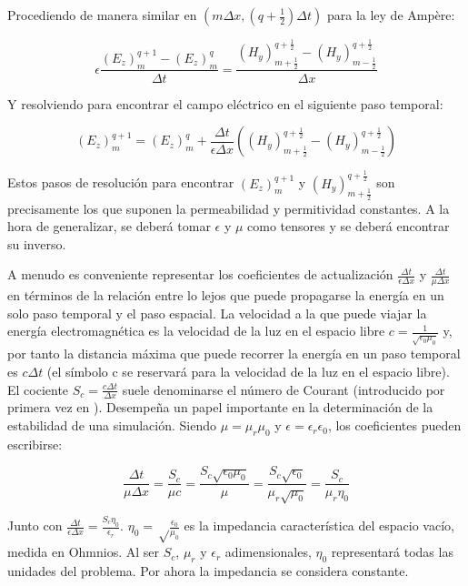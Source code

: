 Procediendo de manera similar en $(m\Delta x, (q+ \frac{1}{2})\Delta t)$ para la ley de Ampère:

\begin{equation}
    \epsilon \frac{(E_z)^{q+1}_{m} - (E_z)^{q}_{m}}{\Delta t} = \frac{(H_y)^{q + \frac{1}{2}}_{m+\frac{1}{2}} - (H_y)^{q+ \frac{1}{2}}_{m-\frac{1}{2}}}{\Delta x}
\end{equation}

Y resolviendo para encontrar el campo eléctrico en el siguiente paso temporal:

\begin{equation}\label{ec:update_E_1D}
    (E_z)^{q+1}_{m} = (E_z)^{q}_{m} + \frac{\Delta t}{\epsilon \Delta x}\left((H_y)^{q + \frac{1}{2}}_{m+\frac{1}{2}} - (H_y)^{q+ \frac{1}{2}}_{m-\frac{1}{2}}\right)
\end{equation}

Estos pasos de resolución para encontrar $(E_z)^{q+1}_{m}$ y $(H_y)^{q+\frac{1}{2}}_{m+\frac{1}{2}}$ son precisamente los que suponen la permeabilidad y permitividad constantes. A la hora de generalizar, se deberá tomar $\epsilon$ y $\mu$ como tensores y se deberá encontrar su inverso.

A menudo es conveniente representar los coeficientes de actualización $\frac{\Delta t}{\epsilon \Delta x}$ y $\frac{\Delta t}{\mu \Delta x}$ en términos de la relación entre lo lejos que puede propagarse la energía en un solo paso temporal y el paso espacial. La velocidad a la que puede viajar la energía electromagnética es la velocidad de la luz en el espacio libre $c = \frac{1}{\sqrt{\epsilon_0 \mu_0}}$ y, por tanto la distancia máxima que puede recorrer la energía en un paso temporal es $c\Delta t$ (el símbolo c se reservará para la velocidad de la luz en el espacio libre). El cociente $S_c = \frac{c\Delta t}{\Delta x}$ suele denominarse el número de Courant (introducido por primera vez en \cite{courant_partial_1956}). Desempeña un papel importante en la determinación de la estabilidad de una simulación. Siendo $\mu = \mu_r \mu_0$ y $\epsilon = \epsilon_r \epsilon_0$, los coeficientes pueden escribirse:

\begin{equation}
    \frac{\Delta t}{\mu \Delta x} = \frac{S_c}{\mu c} = \frac{S_c \sqrt{\epsilon_0 \mu_0}}{\mu} = \frac{S_c \sqrt{\epsilon_0}}{\mu_r \sqrt{\mu_0}} = \frac{S_c }{\mu_r \eta_0}
\end{equation}

Junto con $\frac{\Delta t}{\epsilon \Delta x} = \frac{S_c \eta_0}{\epsilon_r}$. $\eta_0 = \sqrt \frac{\epsilon_0}{\mu_0}$ es la impedancia característica del espacio vacío, medida en Ohmnios. Al ser $S_c$, $\mu_r$ y $\epsilon_r$ adimensionales, $\eta_0$ representará todas las unidades del problema. Por ahora la impedancia se considera constante.

